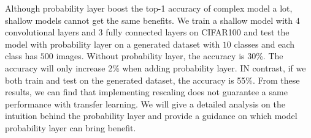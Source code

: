 \documentclass{article}
\begin{document}
Although probability layer boost the top-1 accuracy of complex model a lot, shallow models cannot get the same benefits. We train a shallow model with $4$ convolutional layers and $3$ fully connected layers on CIFAR100 and test the model with probability layer on a generated dataset with $10$ classes and each class has $500$ images. Without probability layer, the accuracy is 30\%. The accuracy will only increase 2\% when adding probability layer. IN contrast, if we both train and test on the generated dataset, the accuracy is 55\%. From these results, we can find that implementing rescaling does not guarantee a same performance with transfer learning. We will give a detailed analysis on the intuition behind the probability layer and provide a guidance on which model probability layer can bring benefit.
\end{document}
